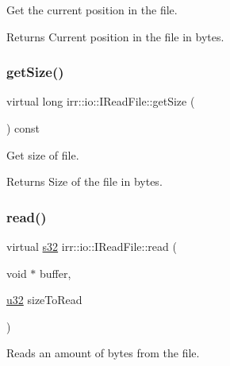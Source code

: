 Get the current position in the file. 

\begin{DoxyReturn}{Returns}
Current position in the file in bytes. 
\end{DoxyReturn}
\mbox{\label{classirr_1_1io_1_1IReadFile_a9c64fca7f1d665d7e458cd7d766c35a2}} 
\subsubsection{\texorpdfstring{get\+Size()}{getSize()}}
{\footnotesize\ttfamily virtual long irr\+::io\+::\+I\+Read\+File\+::get\+Size (\begin{DoxyParamCaption}{ }\end{DoxyParamCaption}) const\hspace{0.3cm}{\ttfamily [pure virtual]}}



Get size of file. 

\begin{DoxyReturn}{Returns}
Size of the file in bytes. 
\end{DoxyReturn}
\mbox{\label{classirr_1_1io_1_1IReadFile_ab51878d36bc9dd3964b664055fbeb13f}} 
\subsubsection{\texorpdfstring{read()}{read()}}
{\footnotesize\ttfamily virtual \hyperlink{namespaceirr_ac66849b7a6ed16e30ebede579f9b47c6}{s32} irr\+::io\+::\+I\+Read\+File\+::read (\begin{DoxyParamCaption}\item[{void $\ast$}]{buffer,  }\item[{\hyperlink{namespaceirr_a0416a53257075833e7002efd0a18e804}{u32}}]{size\+To\+Read }\end{DoxyParamCaption})\hspace{0.3cm}{\ttfamily [pure virtual]}}



Reads an amount of bytes from the file. 


